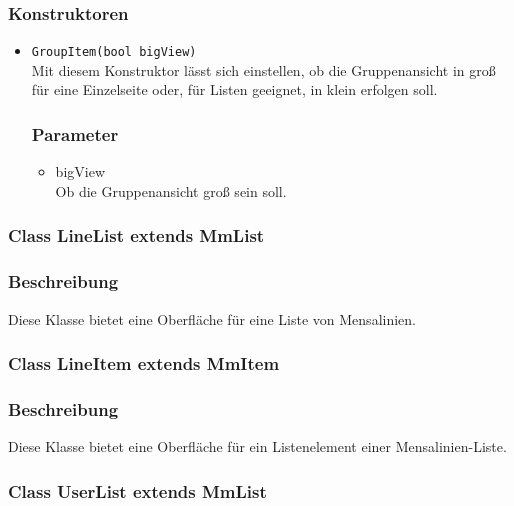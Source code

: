 \documentclass[a4paper]{scrreprt}
\begin{document}
\subsubsection*{Konstruktoren}
\begin{addmargin}[25pt]{0pt}
\begin{itemize}

\item \texttt{GroupItem(bool bigView)}\\
	Mit diesem Konstruktor lässt sich einstellen, ob die Gruppenansicht in groß für eine Einzelseite oder, für Listen geeignet, in klein erfolgen soll. 

	\subsubsection*{Parameter}
	\begin{itemize}
	\item bigView \\
		Ob die Gruppenansicht groß sein soll. 
	\end{itemize}

\end{itemize}
\end{addmargin}


\subsubsection{Class LineList extends MmList}
\subsubsection*{Beschreibung}
Diese Klasse bietet eine Oberfläche für eine Liste von Mensalinien. 


\subsubsection{Class LineItem extends MmItem}
\subsubsection*{Beschreibung}
Diese Klasse bietet eine Oberfläche für ein Listenelement einer Mensalinien-Liste.


\subsubsection{Class UserList extends MmList}
\end{document}
